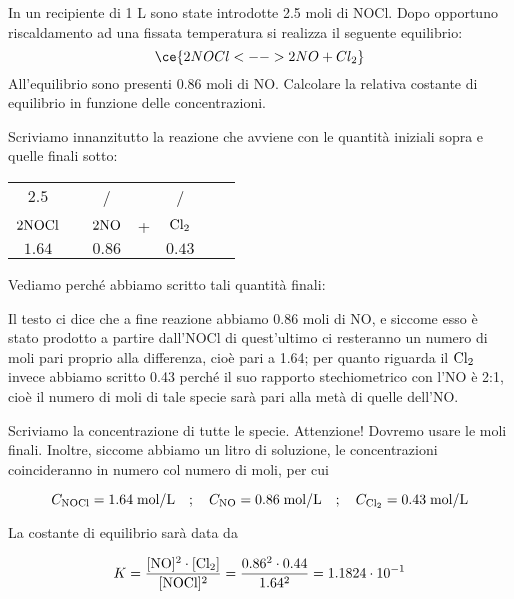 \begin{esercizio}
    In un recipiente di 1 L sono state introdotte 2.5 moli di NOCl. Dopo opportuno riscaldamento ad una fissata temperatura si realizza il seguente equilibrio:
    \begin{equation*}
        \ce{2 NOCl <--> 2NO + Cl_2}
    \end{equation*}
    All'equilibrio sono presenti 0.86 moli di NO. Calcolare la relativa costante di equilibrio in funzione delle concentrazioni.
\end{esercizio}
\begin{soluzione}
    Scriviamo innanzitutto la reazione che avviene con le quantità iniziali sopra e quelle finali sotto: 

\begin{center}
    \begin{tabular}{ccccccc}
        $2.5$ & & / & & /\\
        $\rm 2NOCl$ & \ce{<-->} & $\rm 2NO$ & + & $\rm Cl_2$\\
        $1.64$ & & $0.86$ & & $0.43$\\
    \end{tabular}
\end{center}

Vediamo perché abbiamo scritto tali quantità finali:

Il testo ci dice che a fine reazione abbiamo 0.86 moli di NO, e siccome esso è stato prodotto a partire dall'NOCl di quest'ultimo ci resteranno un numero di moli pari proprio alla differenza, cioè pari a 1.64; per quanto riguarda il $\rm Cl_2$ invece abbiamo scritto 0.43 perché il suo rapporto stechiometrico con l'NO è 2:1, cioè il numero di moli di tale specie sarà pari alla metà di quelle dell'NO.

Scriviamo la concentrazione di tutte le specie. Attenzione! Dovremo usare le moli finali. Inoltre, siccome abbiamo un litro di soluzione, le concentrazioni coincideranno in numero col numero di moli, per cui

$$C_{\rm NOCl}=1.64 \; \text{mol/L}
\quad;\quad
C_{\rm NO}=0.86 \; \text{mol/L}
\quad;\quad
C_{\rm Cl_2}=0.43 \; \text{mol/L}$$

La costante di equilibrio sarà data da

$$K=\rm \frac{[NO]^2 \cdot [Cl_2]}{[NOCl]^2}
=\frac{0.86^2 \cdot 0.44}{1.64^2}=1.1824 \cdot 10^{-1}$$
\end{soluzione}

\newpage

